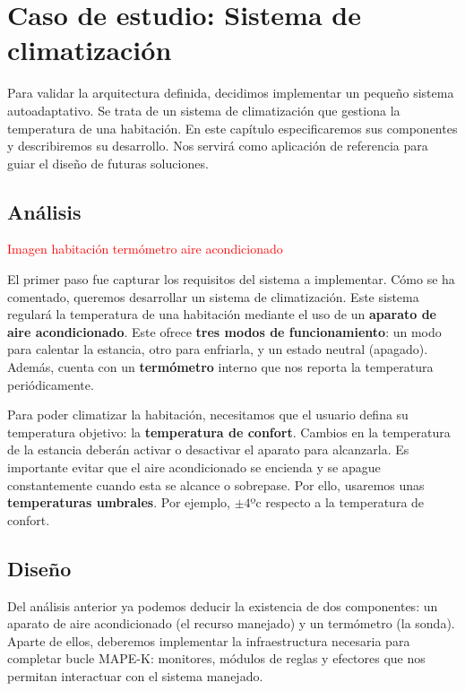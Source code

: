 \chapter{Caso de estudio: Sistema de climatización}
\label{chap:caso_estudio}

Para validar la arquitectura definida, decidimos implementar un pequeño sistema autoadaptativo. Se trata de un sistema de climatización que gestiona la temperatura de una habitación. En este capítulo especificaremos sus componentes y describiremos su desarrollo. Nos servirá como aplicación de referencia para guiar el diseño de futuras soluciones.

\section{Análisis}

\textcolor{red}{Imagen habitación termómetro aire acondicionado}

El primer paso fue capturar los requisitos del sistema a implementar. Cómo se ha comentado, queremos desarrollar un sistema de climatización. Este sistema regulará la temperatura de una habitación mediante el uso de un \textbf{aparato de aire acondicionado}. Este ofrece \textbf{tres modos de funcionamiento}: un modo para calentar la estancia, otro para enfriarla, y un estado neutral (apagado). Además, cuenta con un \textbf{termómetro} interno que nos reporta la temperatura periódicamente.

Para poder climatizar la habitación, necesitamos que el usuario defina su temperatura objetivo: la \textbf{temperatura de confort}. Cambios en la temperatura de la estancia deberán activar o desactivar el aparato para alcanzarla. Es importante evitar que el aire acondicionado se encienda y se apague constantemente cuando esta se alcance o sobrepase. Por ello, usaremos unas \textbf{temperaturas umbrales}. Por ejemplo, $\pm 4$ºc respecto a la temperatura de confort.

\section{Diseño}

Del análisis anterior ya podemos deducir la existencia de dos componentes: un aparato de aire acondicionado (el recurso manejado) y un termómetro (la sonda). Aparte de ellos, deberemos implementar la infraestructura necesaria para completar bucle MAPE-K: monitores, módulos de reglas y efectores que nos permitan interactuar con el sistema manejado.

